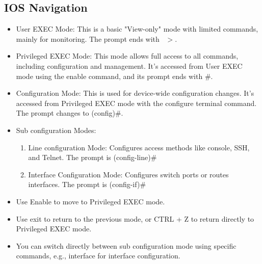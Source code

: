 \documentclass[a4paper,11pt]{article}
\begin{document}
\subsection{IOS Navigation}
\begin{itemize}
    \item User EXEC Mode: This is a basic "View-only" mode with limited commands, mainly for monitoring. The prompt ends with \ $>$.\\
    \item Privileged EXEC Mode: This mode allows full access to all commands, including configuration and management. It's accessed from User EXEC mode using the  enable command, and its prompt ends with \#.\\
    \item Configuration Mode: This is used for device-wide configuration changes. It's  accessed from Privileged EXEC mode with the configure terminal command. The prompt changes to (config)\#.\\
    \item Sub configuration Modes:\\
    \begin{enumerate}
        \item Line configuration Mode: Configures access methods like console, SSH, and Telnet. The prompt is (config-line)\#\\
        \item Interface Configuration Mode: Configures switch ports or routes interfaces. The prompt is (config-if)\#\\
    \end{enumerate}
\end{itemize}

\begin{tcolorbox}[colframe=gray!80, colback=gray!20, coltitle=black, title= EXEC mode]
    
    \begin{itemize}
        \item Use Enable to move to Privileged EXEC mode.\\
        \item Use exit to return to the previous mode, or CTRL + Z to return directly to Privileged EXEC mode.\\
        \item You can switch directly between sub configuration mode using specific commands, e.g., interface for interface configuration.\\
    \end{itemize}
\end{tcolorbox}
\end{document}
